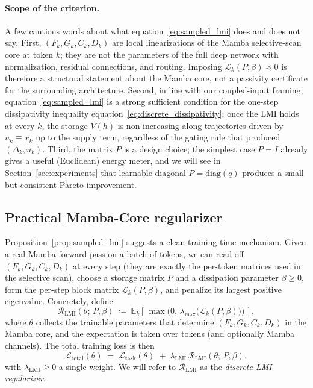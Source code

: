 \documentclass[10pt]{article} %
\def\eqref#1{equation~\ref{#1}}
\theoremstyle{definition}
\begin{document}
\paragraph{Scope of the criterion.} A few cautious words about what \eqref{eq:sampled_lmi} does and does not say. First, $(F_k,G_k,C_k,D_k)$ are local linearizations of the Mamba selective-scan core at token $k$; they are not the parameters of the full deep network with normalization, residual connections, and routing. Imposing $\mathcal{L}_k(P,\beta)\preceq 0$ is therefore a structural statement about the Mamba core, not a passivity certificate for the surrounding architecture. Second, in line with our coupled-input framing, \eqref{eq:sampled_lmi} is a strong sufficient condition for the one-step dissipativity inequality \eqref{eq:discrete_dissipativity}: once the LMI holds at every $k$, the storage $V(h)$ is non-increasing along trajectories driven by $u_k\equiv x_k$ up to the supply term, regardless of the gating rule that produced $(\Delta_k,u_k)$. Third, the matrix $P$ is a design choice; the simplest case $P=I$ already gives a useful (Euclidean) energy meter, and we will see in Section~\ref{sec:experiments} that learnable diagonal $P=\mathrm{diag}(q)$ produces a small but consistent Pareto improvement.

\subsection{Practical Mamba-Core regularizer}
\label{subsec:practical_regularizer}

Proposition~\ref{prop:sampled_lmi} suggests a clean training-time mechanism. Given a real Mamba forward pass on a batch of tokens, we can read off $(F_k,G_k,C_k,D_k)$ at every step (they are exactly the per-token matrices used in the selective scan), choose a storage matrix $P$ and a dissipation parameter $\beta\ge 0$, form the per-step block matrix $\mathcal{L}_k(P,\beta)$, and penalize its largest positive eigenvalue. Concretely, define
\begin{equation}
\label{eq:lmi_regularizer}
\mathcal{R}_{\mathrm{LMI}}(\theta;\,P,\beta)
\;\coloneqq\; \mathbb{E}_k\!\left[\, \max\bigl(0,\,\lambda_{\max}\bigl(\mathcal{L}_k(P,\beta)\bigr)\bigr) \,\right],
\end{equation}
where $\theta$ collects the trainable parameters that determine $(F_k,G_k,C_k,D_k)$ in the Mamba core, and the expectation is taken over tokens (and optionally Mamba channels). The total training loss is then
\[
\mathcal{L}_{\mathrm{total}}(\theta)
\;=\; \mathcal{L}_{\mathrm{task}}(\theta)
\;+\; \lambda_{\mathrm{LMI}}\, \mathcal{R}_{\mathrm{LMI}}(\theta;\,P,\beta),
\]
with $\lambda_{\mathrm{LMI}}\ge 0$ a single weight. We will refer to $\mathcal{R}_{\mathrm{LMI}}$ as the \emph{discrete LMI regularizer}.
\end{document}
